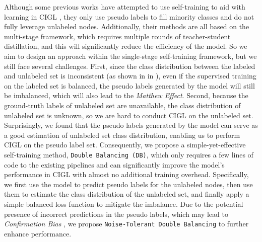 Although some previous works have attempted to use self-training to aid with learning in CIGL \cite{yan2023unreal,zhou2023graphsr,zhang2024bim}, they only use pseudo labels to fill minority classes and do not fully leverage unlabeled nodes. Additionally, their methods are all based on the multi-stage framework, which requires multiple rounds of teacher-student distillation, and this will significantly reduce the efficiency of the model. So we aim to design an approach within the single-stage self-training framework, but we still face several challenges. First, since the class distribution between the labeled and unlabeled set is inconsistent (as shown in  in ), even if the supervised training on the labeled set is balanced, the pseudo labels generated by the model will still be imbalanced, which will also lead to the \emph{Matthew Effect}. Second, because the ground-truth labels of unlabeled set are unavailable, the class distribution of unlabeled set is unknown, so we are hard to conduct CIGL on the unlabeled set. Surprisingly, we found that the pseudo labels generated by the model can serve as a good estimation of unlabeled set class distribution, enabling us to perform CIGL on the pseudo label set. Consequently, we propose a simple-yet-effective self-training method, \texttt{Double Balancing (DB)}, which only requires a few lines of code to the existing pipelines and can significantly improve the model's performance in CIGL with almost no additional training overhead. Specifically, we first use the model to predict pseudo labels for the unlabeled nodes, then use them to estimate the class distribution of the unlabeled set, and finally apply a simple balanced loss function to mitigate the imbalance. Due to the potential presence of incorrect predictions in the pseudo labels, which may lead to \emph{Confirmation Bias} \cite{arazo2020pseudo}, we propose \texttt{Noise-Tolerant Double Balancing} to further enhance performance. 

